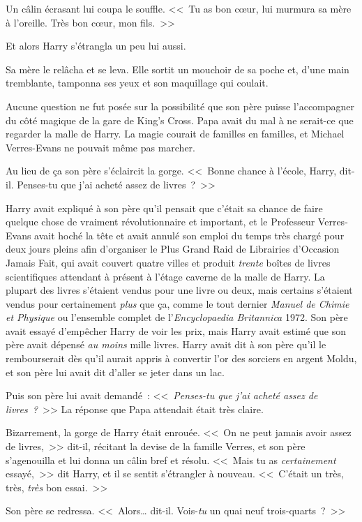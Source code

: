 Un câlin écrasant lui coupa le souffle. <<~Tu as bon cœur, lui murmura sa mère à l'oreille. Très bon cœur, mon fils.~>>

Et alors Harry s'étrangla un peu lui aussi.

Sa mère le relâcha et se leva. Elle sortit un mouchoir de sa poche et, d'une main tremblante, tamponna ses yeux et son maquillage qui coulait.

Aucune question ne fut posée sur la possibilité que son père puisse l'accompagner du côté magique de la gare de King's Cross. Papa avait du mal à ne serait-ce que regarder la malle de Harry. La magie courait de familles en familles, et Michael Verres-Evans ne pouvait même pas marcher.

Au lieu de ça son père s'éclaircit la gorge. <<~Bonne chance à l'école, Harry, dit-il. Penses-tu que j'ai acheté assez de livres~?~>>

Harry avait expliqué à son père qu'il pensait que c'était sa chance de faire quelque chose de vraiment révolutionnaire et important, et le Professeur Verres-Evans avait hoché la tête et avait annulé son emploi du temps très chargé pour deux jours pleins afin d'organiser le Plus Grand Raid de Librairies d'Occasion Jamais Fait, qui avait couvert quatre villes et produit \emph{trente} boîtes de livres scientifiques attendant à présent à l'étage caverne de la malle de Harry. La plupart des livres s'étaient vendus pour une livre ou deux, mais certains s'étaient vendus pour certainement \emph{plus} que ça, comme le tout dernier \emph{Manuel de Chimie et Physique} ou l'ensemble complet de l'\emph{Encyclopaedia Britannica} 1972. Son père avait essayé d'empêcher Harry de voir les prix, mais Harry avait estimé que son père avait dépensé \emph{au moins} mille livres. Harry avait dit à son père qu'il le rembourserait dès qu'il aurait appris à convertir l'or des sorciers en argent Moldu, et son père lui avait dit d'aller se jeter dans un lac.

Puis son père lui avait demandé~: <<~\emph{Penses-tu que j'ai acheté assez de livres~?}~>> La réponse que Papa attendait était très claire.

Bizarrement, la gorge de Harry était enrouée. <<~On ne peut jamais avoir assez de livres,~>> dit-il, récitant la devise de la famille Verres, et son père s'agenouilla et lui donna un câlin bref et résolu. <<~Mais tu as \emph{certainement} essayé,~>> dit Harry, et il se sentit s'étrangler à nouveau. <<~C'était un très, très, \emph{très} bon essai.~>>

Son père se redressa. <<~Alors… dit-il. Vois-\emph{tu} un quai neuf trois-quarts~?~>>

